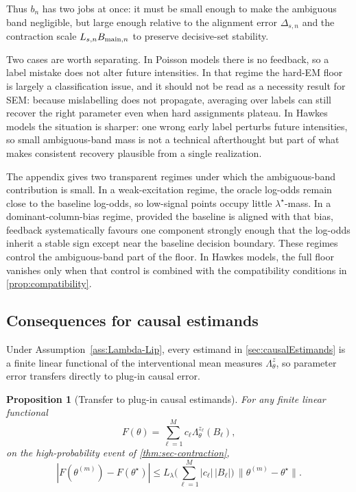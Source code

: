 \documentclass{statsoc}
\newtheorem{proposition}[proposition]{Proposition}
\newcommand{\1}{\mathbbm{1}}
\begin{document}
Thus \(b_n\) has two jobs at once: it must be small enough to make the ambiguous band negligible, but large enough relative to the alignment error \(\Delta_{s,n}\) and the contraction scale \(L_{s,n}B_{{\rm main},n}\) to preserve decisive-set stability.

Two cases are worth separating. In Poisson models there is no feedback, so a label mistake does not alter future intensities. In that regime the hard-EM floor is largely a classification issue, and it should not be read as a necessity result for SEM: because mislabelling does not propagate, averaging over labels can still recover the right parameter even when hard assignments plateau. In Hawkes models the situation is sharper: one wrong early label perturbs future intensities, so small ambiguous-band mass is not a technical afterthought but part of what makes consistent recovery plausible from a single realization. 

The appendix gives two transparent regimes under which the ambiguous-band contribution is small. In a weak-excitation regime, the oracle log-odds remain close to the baseline log-odds, so low-signal points occupy little \(\lambda^\star\)-mass. In a dominant-column-bias regime, provided the baseline is aligned with that bias, feedback systematically favours one component strongly enough that the log-odds inherit a stable sign except near the baseline decision boundary. These regimes control the ambiguous-band part of the floor. In Hawkes models, the full floor vanishes only when that control is combined with the compatibility conditions in \cref{prop:compatibility}.

\subsection{Consequences for causal estimands}\label{subsec:estimands}


Under Assumption~\ref{ass:Lambda-Lip}, every estimand in \cref{sec:causalEstimands} is a finite linear functional of the interventional mean measures \(\Lambda_\theta^z\), so parameter error transfers directly to plug-in causal error.

\begin{proposition}[Transfer to plug-in causal estimands]\label{thm:sec-estimands}
For any finite linear functional
\[
F(\theta)=\sum_{\ell=1}^M c_\ell \Lambda_\theta^{z_\ell}(B_\ell),
\]
on the high-probability event of \cref{thm:sec-contraction},
\[
|F(\theta^{(m)})-F(\theta^\star)|
\le
L_\lambda\Big(\sum_{\ell=1}^M |c_\ell|\,|B_\ell|\Big)\,\|\theta^{(m)}-\theta^\star\|.
\]
\end{proposition}
\end{document}

